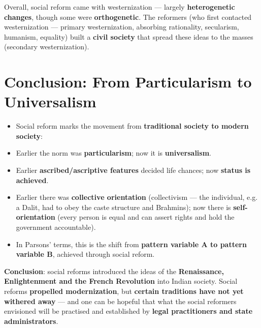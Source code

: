 Overall, social reform came with westernization --- largely \textbf{heterogenetic changes}, though some were \textbf{orthogenetic}. The reformers (who first contacted westernization --- primary westernization, absorbing rationality, secularism, humanism, equality) built a \textbf{civil society} that spread these ideas to the masses (secondary westernization).

\section{Conclusion: From Particularism to Universalism}

\begin{KeyConcept}
\begin{itemize}
\item Social reform marks the movement from \textbf{traditional society to modern society}:
\item Earlier the norm was \textbf{particularism}; now it is \textbf{universalism}.
\item Earlier \textbf{ascribed/ascriptive features} decided life chances; now \textbf{status is achieved}.
\item Earlier there was \textbf{collective orientation} (collectivism --- the individual, e.g. a Dalit, had to obey the caste structure and Brahmins); now there is \textbf{self-orientation} (every person is equal and can assert rights and hold the government accountable).
\item In Parsons' terms, this is the shift from \textbf{pattern variable A to pattern variable B}, achieved through social reform.
\end{itemize}
\end{KeyConcept}

\begin{KeyConcept}
\textbf{Conclusion}: social reforms introduced the ideas of the \textbf{Renaissance, Enlightenment and the French Revolution} into Indian society. Social reforms \textbf{propelled modernization}, but \textbf{certain traditions have not yet withered away} --- and one can be hopeful that what the social reformers envisioned will be practised and established by \textbf{legal practitioners and state administrators}.
\end{KeyConcept}

